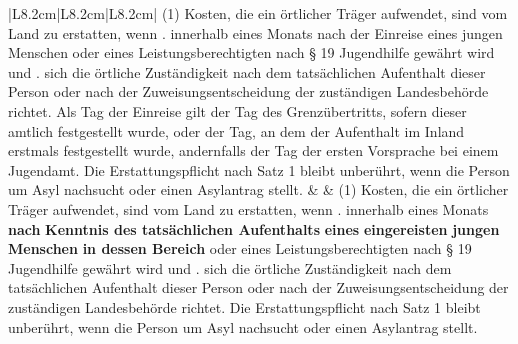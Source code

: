 \documentclass[10pt,a4paper,landscape]{article}
\begin{document}
\begin{longtable}{|L{8.2cm}|L{8.2cm}|L{8.2cm}|}
(1) Kosten, die ein örtlicher Träger  \newline aufwendet, sind vom Land zu erstatten,  \newline wenn   .  innerhalb eines Monats nach \textcolor{diffred}{der  \newline Einreise} eines jungen Menschen oder  \newline eines Leistungsberechtigten nach \S{} 19  \newline Jugendhilfe gewährt wird und   . sich die örtliche Zuständigkeit nach dem  \newline tatsächlichen Aufenthalt dieser Person  \newline oder nach der Zuweisungsentscheidung  \newline der zuständigen Landesbehörde richtet.   \newline \textcolor{diffred}{Als Tag der Einreise gilt der Tag des  \newline Grenzübertritts, sofern dieser amtlich  \newline festgestellt wurde, oder der Tag, an dem  \newline der Aufenthalt im Inland erstmals  \newline festgestellt wurde, andernfalls der Tag der  \newline ersten Vorsprache bei einem Jugendamt.}  \newline Die Erstattungspflicht nach Satz 1 bleibt  \newline unberührt, wenn die Person um Asyl  \newline nachsucht oder einen Asylantrag stellt. &  & (1) Kosten, die ein örtlicher Träger  \newline aufwendet, sind vom Land zu erstatten,  \newline wenn   .  innerhalb eines Monats \textbf{nach }\textbf{\textcolor{diffgreen}{Kenntnis  \newline des tatsächlichen Aufenthalts}}\textbf{ eines} \newline \textbf{\textcolor{diffgreen}{eingereisten}}\textbf{ jungen Menschen }\textbf{\textcolor{diffgreen}{in  \newline dessen Bereich}} oder eines  \newline Leistungsberechtigten nach \S{} 19  \newline Jugendhilfe gewährt wird und   . sich die örtliche Zuständigkeit nach dem  \newline tatsächlichen Aufenthalt dieser Person  \newline oder nach der Zuweisungsentscheidung  \newline der zuständigen Landesbehörde richtet.   \newline Die Erstattungspflicht nach Satz 1 bleibt  \newline unberührt, wenn die Person um Asyl  \newline nachsucht oder einen Asylantrag stellt. \\

\end{longtable}
\end{document}
